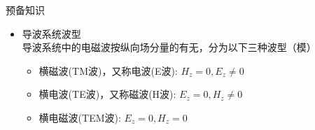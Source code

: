 \begin{frame}{预备知识}
    \begin{itemize}
        \item 导波系统波型\\
              导波系统中的电磁波按纵向场分量的有无，分为以下三种波型（模）
              \begin{itemize}
                  \item 横磁波(TM波)，又称电波(E波): $H_z=0,E_z\neq 0$
                  \item 横电波(TE波)，又称磁波(H波): $E_z=0,H_z\neq 0$
                  \item 横电磁波(TEM波): $E_z=0,H_z=0$
              \end{itemize}
    \end{itemize}
\end{frame}


